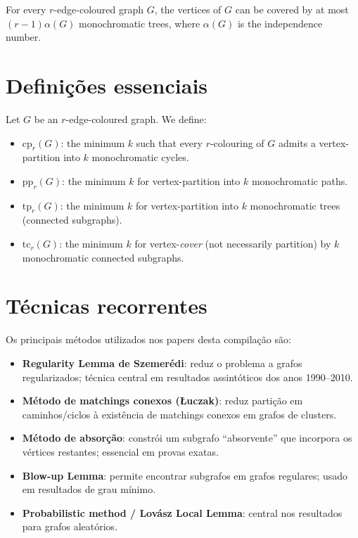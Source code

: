 \documentclass[12pt,a4paper,twoside,openright]{book}
\theoremstyle{definition}
\begin{document}
\begin{conjecture}\label{conj:ryser}
For every $r$-edge-coloured graph $G$, the vertices of $G$ can be covered by at most $(r-1)\alpha(G)$
monochromatic trees, where $\alpha(G)$ is the independence number.
\end{conjecture}


\section{Definições essenciais}


\begin{definition}
Let $G$ be an $r$-edge-coloured graph. We define:
\begin{itemize}[leftmargin=*]
  \item $\mathrm{cp}_r(G)$: the minimum $k$ such that every $r$-colouring of $G$ admits a vertex-partition into
        $k$ monochromatic cycles.
  \item $\mathrm{pp}_r(G)$: the minimum $k$ for vertex-partition into $k$ monochromatic paths.
  \item $\mathrm{tp}_r(G)$: the minimum $k$ for vertex-partition into $k$ monochromatic trees (connected subgraphs).
  \item $\mathrm{tc}_r(G)$: the minimum $k$ for vertex-\emph{cover} (not necessarily partition) by $k$ monochromatic
        connected subgraphs.
\end{itemize}
\end{definition}


\section{Técnicas recorrentes}

Os principais métodos utilizados nos papers desta compilação são:
\begin{itemize}[leftmargin=*]
  \item \textbf{Regularity Lemma de Szemerédi}: reduz o problema a grafos regularizados; técnica central
        em resultados assintóticos dos anos 1990--2010.
  \item \textbf{Método de matchings conexos (Łuczak)}: reduz partição em caminhos/ciclos à existência de
        matchings conexos em grafos de clusters.
  \item \textbf{Método de absorção}: constrói um subgrafo ``absorvente'' que incorpora os vértices restantes;
        essencial em provas exatas.
  \item \textbf{Blow-up Lemma}: permite encontrar subgrafos em grafos regulares; usado em resultados de grau mínimo.
  \item \textbf{Probabilistic method / Lovász Local Lemma}: central nos resultados para grafos aleatórios.
\end{itemize}
\end{document}
